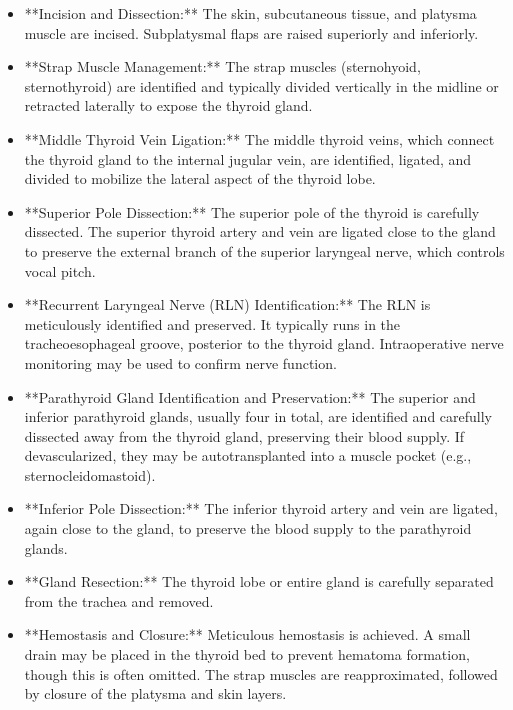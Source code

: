 \begin{itemize}
  \item **Incision and Dissection:** The skin, subcutaneous tissue, and platysma muscle are incised. Subplatysmal flaps are raised superiorly and inferiorly.
  
  \item **Strap Muscle Management:** The strap muscles (sternohyoid, sternothyroid) are identified and typically divided vertically in the midline or retracted laterally to expose the thyroid gland.
  
  \item **Middle Thyroid Vein Ligation:** The middle thyroid veins, which connect the thyroid gland to the internal jugular vein, are identified, ligated, and divided to mobilize the lateral aspect of the thyroid lobe.
  
  \item **Superior Pole Dissection:** The superior pole of the thyroid is carefully dissected. The superior thyroid artery and vein are ligated close to the gland to preserve the external branch of the superior laryngeal nerve, which controls vocal pitch.
  
  \item **Recurrent Laryngeal Nerve (RLN) Identification:** The RLN is meticulously identified and preserved. It typically runs in the tracheoesophageal groove, posterior to the thyroid gland. Intraoperative nerve monitoring may be used to confirm nerve function.
  
  \item **Parathyroid Gland Identification and Preservation:** The superior and inferior parathyroid glands, usually four in total, are identified and carefully dissected away from the thyroid gland, preserving their blood supply. If devascularized, they may be autotransplanted into a muscle pocket (e.g., sternocleidomastoid).
  
  \item **Inferior Pole Dissection:** The inferior thyroid artery and vein are ligated, again close to the gland, to preserve the blood supply to the parathyroid glands.
  
  \item **Gland Resection:** The thyroid lobe or entire gland is carefully separated from the trachea and removed.
  
  \item **Hemostasis and Closure:** Meticulous hemostasis is achieved. A small drain may be placed in the thyroid bed to prevent hematoma formation, though this is often omitted. The strap muscles are reapproximated, followed by closure of the platysma and skin layers.
\end{itemize}

